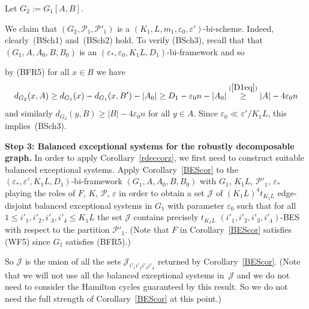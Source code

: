 \documentclass{memo-l}
\def\COMMENT#1{}
\def\cP{\mathcal{P}}
\def\eps{\varepsilon}
\def\cJ{\mathcal{J}}
\def\epszero{\eps_0}
\numberwithin{section}{chapter}
\numberwithin{equation}{section}
\numberwithin{firstthm}{section}
\numberwithin{figure}{section}
\begin{document}
{Let $G_2:=G_1[A,B]$.%
   \COMMENT{Daniela: changed def because of change in def of (..)-system, before had "Let $G_2$ be the spanning subgraph of $G_1$ obtained by
keeping all $AB$-edges and deleting all other edges". So $G_2$ included $V_0$.}
We claim that $(G_2, \mathcal{P}_1,\mathcal{P'}_1)$ is a $(K_1, L, m_1, \epszero,\eps')$-bi-scheme. Indeed, clearly~(BSch1) and~(BSch2) hold.
To verify (BSch3), recall that that $(G_1,A,A_0,B,B_0)$ is an $(\eps_*,\eps_0,K_1L,D_1)$-bi-framework and so%
   \COMMENT{Daniela added more detail}
by (BFR5) for all $x \in B$ we have 
$$
d_{G_2}(x,A)\ge d_{G_1}(x)-d_{G_1}(x,B')-|A_0| \ge D_1 - \eps_0n -|A_0| \stackrel{(\ref{D1eq})}{\ge} |A| -4 \eps_0 n
$$ and
similarly $d_{G_2}(y,B)\ge |B| -4 \eps_0 n$ for all $y\in A$. Since $\eps_0\ll \eps'/K_1L$, this implies~(BSch3).\COMMENT{Here we are just using that $\eps_0 n \ll \eps' |A_{i,j}|$, not e.g. (P2)}

\smallskip

\noindent\textbf{Step 3: Balanced exceptional systems for the robustly decomposable graph.}
In order to apply Corollary~\ref{rdeccorz}, we first need to construct suitable balanced exceptional systems.
Apply Corollary~\ref{BEScor} to the $(\eps_*,\eps',K_1L,D_1)$-bi-framework $(G_1,A,A_0,B,B_0)$
with $G_1$, $K_1L$, $\cP'_1$, $\eps_*$ playing the roles of $F$, $K$, $\cP$, $\eps$
in order to obtain a set $\cJ$ of $(K_1L)^4t_{K_1L}$ edge-disjoint balanced exceptional systems in $G_1$ with parameter $\eps_0$
such that for all $1 \le i'_1,i'_2,i'_3,i'_4  \le K_1L$ the set $\cJ$ contains precisely $t_{K_1L}$
$(i'_1,i'_2,i'_3,i'_4)$-BES with respect to the partition $\cP'_1$.
(Note that $F$ in Corollary~\ref{BEScor} satisfies (WF5) since $G_1$ satisfies (BFR5).)%
\COMMENT{osthus added bracket}
So $\cJ$ is the union of all the sets $\cJ_{i'_1i'_2i'_3i'_4}$ returned by
Corollary~\ref{BEScor}. (Note that we will not use all the balanced exceptional systems in~$\cJ$ and
we do not need to consider the Hamilton cycles guaranteed by this result. 
So we do not need the full strength of Corollary~\ref{BEScor} at this point.)

}
\end{document}
